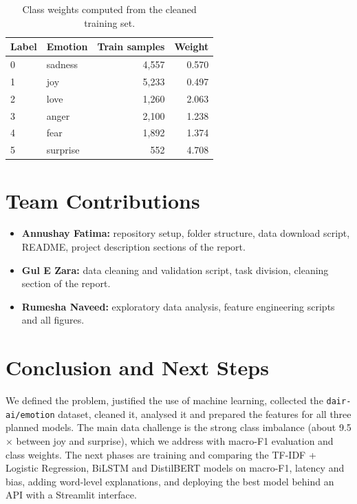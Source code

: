 \documentclass[12pt]{article}
\begin{document}
\begin{table}[H]
\centering
\caption{Class weights computed from the cleaned training set.}
\label{tab:weights}
\begin{tabular}{llrr}
\toprule
Label & Emotion & Train samples & Weight \\
\midrule
0 & sadness  & 4{,}557 & 0.570 \\
1 & joy      & 5{,}233 & 0.497 \\
2 & love     & 1{,}260 & 2.063 \\
3 & anger    & 2{,}100 & 1.238 \\
4 & fear     & 1{,}892 & 1.374 \\
5 & surprise &   552   & 4.708 \\
\bottomrule
\end{tabular}
\end{table}

\section{Team Contributions}
\begin{itemize}
  \item \textbf{Annushay Fatima:} repository setup, folder structure, data download script, README, project description sections of the report.
  \item \textbf{Gul E Zara:} data cleaning and validation script, task division, cleaning section of the report.
  \item \textbf{Rumesha Naveed:} exploratory data analysis, feature engineering scripts and all figures.
\end{itemize}

\section{Conclusion and Next Steps}
We defined the problem, justified the use of machine learning, collected the \texttt{dair-ai/emotion} dataset, cleaned it, analysed it and prepared the features for all three planned models. The main data challenge is the strong class imbalance (about 9.5$\times$ between joy and surprise), which we address with macro-F1 evaluation and class weights. The next phases are training and comparing the TF-IDF + Logistic Regression, BiLSTM and DistilBERT models on macro-F1, latency and bias, adding word-level explanations, and deploying the best model behind an API with a Streamlit interface.
\end{document}
